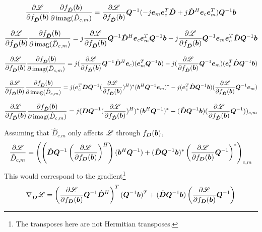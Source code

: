 \begin{appendices}
\begin{equation}
\frac{\partial \mathscr{L}}{\partial f_{\hat{\bm{D}}}(\bm{b})}\frac{\partial f_{\hat{\bm{D}}}(\bm{b})}{\partial \operatorname{imag}(\hat{D}_{c,m})} = \frac{\partial \mathscr{L}}{\partial f_{\hat{\bm{D}}}(\bm{b})}\bm{Q}^{-1}(-j\bm{e}_m\bm{e}_c^T\hat{\bm{D}} + j\hat{\bm{D}}^H\bm{e}_c\bm{e}_m^T)\bm{Q}^{-1}\bm{b}
\end{equation}

\begin{equation}
\frac{\partial \mathscr{L}}{\partial f_{\hat{\bm{D}}}(\bm{b})}\frac{\partial f_{\hat{\bm{D}}}(\bm{b})}{\partial \operatorname{imag}(\hat{D}_{c,m})} = j\frac{\partial \mathscr{L}}{\partial f_{\hat{\bm{D}}}(\bm{b})}\bm{Q}^{-1}\hat{\bm{D}}^H\bm{e}_c\bm{e}_m^T\bm{Q}^{-1}\bm{b} - j\frac{\partial \mathscr{L}}{\partial f_{\hat{\bm{D}}}(\bm{b})}\bm{Q}^{-1}\bm{e}_m\bm{e}_c^T\hat{\bm{D}}\bm{Q}^{-1}\bm{b}
\end{equation}

\begin{equation}
\frac{\partial \mathscr{L}}{\partial f_{\hat{\bm{D}}}(\bm{b})}\frac{\partial f_{\hat{\bm{D}}}(\bm{b})}{\partial \operatorname{imag}(\hat{D}_{c,m})} = j(\frac{\partial \mathscr{L}}{\partial f_{\hat{\bm{D}}}(\bm{b})}\bm{Q}^{-1}\hat{\bm{D}}^H\bm{e}_c)(\bm{e}_m^T\bm{Q}^{-1}\bm{b}) - j(\frac{\partial \mathscr{L}}{\partial f_{\hat{\bm{D}}}(\bm{b})}\bm{Q}^{-1}\bm{e}_m)(\bm{e}_c^T\hat{\bm{D}}\bm{Q}^{-1}\bm{b})
\end{equation}

\begin{equation}
\frac{\partial \mathscr{L}}{\partial f_{\hat{\bm{D}}}(\bm{b})}\frac{\partial f_{\hat{\bm{D}}}(\bm{b})}{\partial \operatorname{imag}(\hat{D}_{c,m})} = j(\bm{e}_c^T\bm{D}\bm{Q}^{-1}(\frac{\partial \mathscr{L}}{\partial f_{\hat{\bm{D}}}(\bm{b})})^H)^*(\bm{b}^H\bm{Q}^{-1}\bm{e}_m)^* - j(\bm{e}_c^T\hat{\bm{D}}\bm{Q}^{-1}\bm{b})(\frac{\partial \mathscr{L}}{\partial f_{\hat{\bm{D}}}(\bm{b})}\bm{Q}^{-1}\bm{e}_m)
\end{equation}

\begin{equation}
\frac{\partial \mathscr{L}}{\partial f_{\hat{\bm{D}}}(\bm{b})}\frac{\partial f_{\hat{\bm{D}}}(\bm{b})}{\partial \operatorname{imag}(\hat{D}_{c,m})} = j(\bm{D}\bm{Q}^{-1}(\frac{\partial \mathscr{L}}{\partial f_{\hat{\bm{D}}}(\bm{b})})^H)^*(\bm{b}^H\bm{Q}^{-1})^* - (\hat{\bm{D}}\bm{Q}^{-1}\bm{b})(\frac{\partial \mathscr{L}}{\partial f_{\hat{\bm{D}}}(\bm{b})}\bm{Q}^{-1}))_{c,m}
\end{equation}

Assuming that $\hat{D}_{c.m}$ only affects $\mathscr{L}$ through $f_{\bm{D}}(\bm{b})$,
\begin{equation}
\frac{\partial \mathscr{L}}{\hat{D}_{c,m}} = \left(\left(\hat{\bm{D}}\bm{Q}^{-1}\left(\frac{\partial \mathscr{L}}{\partial f_{\bm{D}}(\bm{b})}\right)^H\right)(\bm{b}^H\bm{Q}^{-1}) + (\hat{\bm{D}}\bm{Q}^{-1}\bm{b})^*\left(\frac{\partial \mathscr{L}}{\partial f_{\bm{D}}(\bm{b})}\bm{Q}^{-1}\right)^*\right)_{c,m}
\end{equation}
This would correspond to the gradient\footnote{The transposes here are not Hermitian transposes.}
\begin{equation}
\nabla_{\hat{\bm{D}}} \mathscr{L} = \left(\frac{\partial \mathscr{L}}{\partial f_{\bm{D}}(\bm{b})}\bm{Q}^{-1}\hat{\bm{D}}^H\right)^T(\bm{Q}^{-1}\bm{b})^T + (\hat{\bm{D}}\bm{Q}^{-1}\bm{b})\left(\frac{\partial \mathscr{L}}{\partial f_{\bm{D}}(\bm{b})}\bm{Q}^{-1}\right)
\end{equation}


\end{appendices}
